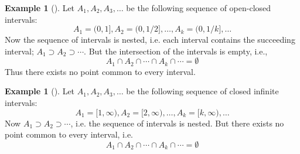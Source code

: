 \documentclass[	DIV=calc,paper=a4,fontsize=11pt]{scrartcl}	 	%
\theoremstyle{definition}
\newtheorem{exmp}[thm]{Example}
\theoremstyle{plain}
\theoremstyle{remark}
\begin{document}
\begin{exmp}[]
Let $A_1,A_2,A_3,\ldots$ be the following sequence of open-closed intervals:
$$A_1=(0,1],A_2=(0,1/2],\ldots,A_k=(0,1/k],\ldots$$
Now the sequence of intervals is nested, i.e. each interval contains the succeeding interval; $A_1\supset A_2\supset \cdots.$ But the intersection of the intervals is empty, i.e.,
$$A_1\cap A_2\cap \cdots \cap A_k\cap \cdots=\emptyset$$
Thus there exists no point common to every interval.
\end{exmp}

\begin{exmp}[]
Let $A_1,A_2,A_3,\ldots$ be the following sequence of closed infinite intervals:
$$A_1=[1,\infty),A_2=[2,\infty),\ldots,A_k=[k,\infty),\ldots$$
Now $A_1\supset A_2\supset \cdots$, i.e. the sequence of intervals is nested. But there exists no point common to every interval, i.e.
$$A_1\cap A_2\cap \cdots \cap A_k\cap \cdots=\emptyset$$
\end{exmp}
\end{document}
